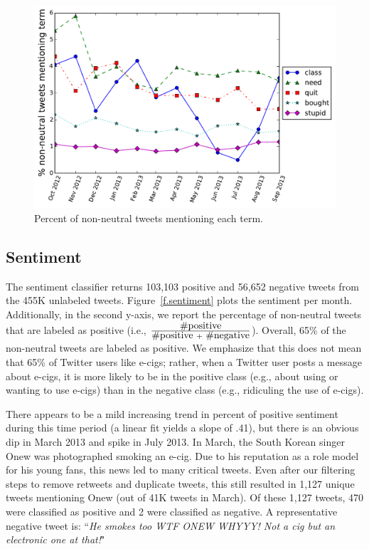 \documentclass{sig-alternate}
\begin{document}
\begin{figure}[t]
  \caption{Percent of non-neutral tweets mentioning each term. \label{f.terms}}
  \includegraphics[width=\columnwidth]{nb/term_trends.pdf}  %
\end{figure}

\subsection{Sentiment}
\label{s.sentiment_results}
The sentiment classifier returns 103,103 positive and 56,652 negative tweets
from the 455K unlabeled tweets. Figure~\ref{f.sentiment} plots the sentiment
per month. Additionally, in the second y-axis, we report the percentage of
non-neutral tweets that are labeled as positive (i.e.,
$\frac{\hbox{\#positive}}{\hbox{\#positive } + \hbox{ \#negative}}$). Overall,
65\% of the non-neutral tweets are labeled as positive. We emphasize that this
does not mean that 65\% of Twitter users like e-cigs; rather, when a Twitter
user posts a message about e-cigs, it is more likely to be in the positive
class (e.g., about using or wanting to use e-cigs) than in the negative class
(e.g., ridiculing the use of e-cigs).

There appears to be a mild increasing trend in percent of positive sentiment
during this time period (a linear fit yields a slope of .41), but there is an
obvious dip in March 2013 and spike in July 2013. In March, the South Korean
singer Onew was photographed smoking an e-cig. Due to his reputation as a role
model for his young fans, this news led to many critical tweets. Even after
our filtering steps to remove retweets and duplicate tweets, this still
resulted in 1,127 unique tweets mentioning Onew (out of 41K tweets in
March). Of these 1,127 tweets, 470 were classified as positive and 2 were
classified as negative. A representative negative tweet is: ``{\it He smokes
  too WTF ONEW WHYYY! Not a cig but an electronic one at that!}"
\end{document}
